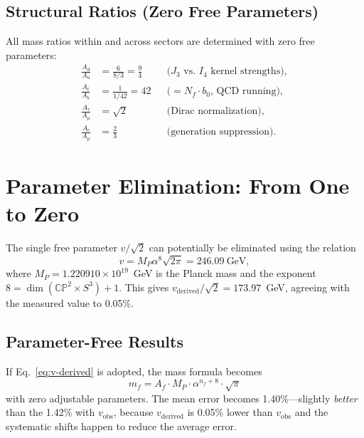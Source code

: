 \documentclass[11pt,a4paper]{article}
\newcommand{\CP}{\mathbb{CP}}
\theoremstyle{remark}
\begin{document}
\subsection{Structural Ratios (Zero Free Parameters)}

All mass ratios within and across sectors are determined with zero free
parameters:
\begin{align}
\frac{A_d}{A_u} &= \frac{6}{8/3} = \frac{9}{4} &&\text{($J_3$ vs.\ $I_4$ kernel strengths)}, \\
\frac{A_t}{A_b} &= \frac{1}{1/42} = 42 &&\text{($= N_f \cdot b_0$, QCD running)}, \\
\frac{A_\tau}{A_\mu} &= \sqrt{2} &&\text{(Dirac normalization)}, \\
\frac{A_e}{A_\mu} &= \frac{2}{3} &&\text{(generation suppression)}.
\end{align}


\section{Parameter Elimination: From One to Zero}
\label{sec:parameter-elimination}

The single free parameter $v/\sqrt{2}$ can potentially be eliminated using
the relation
\begin{equation}
v = M_P \alpha^8 \sqrt{2\pi} = 246.09~\text{GeV},
\label{eq:v-derived}
\end{equation}
where $M_P = 1.220910 \times 10^{19}$~GeV is the Planck mass and the
exponent $8 = \dim(\CP^2 \times S^3) + 1$.  This gives
$v_{\text{derived}}/\sqrt{2} = 173.97$~GeV, agreeing with the measured
value to 0.05\%.

\subsection{Parameter-Free Results}

If Eq.~\eqref{eq:v-derived} is adopted, the mass formula becomes
\begin{equation}
m_f = A_f \cdot M_P \cdot \alpha^{n_f + 8} \cdot \sqrt{\pi}
\end{equation}
with zero adjustable parameters.  The mean error becomes 1.40\%---slightly
\emph{better} than the 1.42\% with $v_{\text{obs}}$, because $v_{\text{derived}}$
is 0.05\% lower than $v_{\text{obs}}$ and the systematic shifts happen to
reduce the average error.
\end{document}
